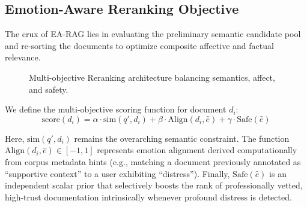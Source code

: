 \documentclass[conference]{IEEEtran}
\begin{document}
\subsection{Emotion-Aware Reranking Objective}
The crux of EA-RAG lies in evaluating the preliminary semantic candidate pool and re-sorting the documents to optimize composite affective and factual relevance.

\begin{figure}[htbp]
\centering
{}
\caption{Multi-objective Reranking architecture balancing semantics, affect, and safety.}
\label{fig:rerank}
\end{figure}

We define the multi-objective scoring function for document $d_i$:
\begin{equation}
\label{eq:score}
\text{score}(d_i) = \alpha \cdot \text{sim}(q', d_i) + \beta \cdot \text{Align}(d_i, \hat{e}) + \gamma \cdot \text{Safe}(\hat{e})
\end{equation}

Here, $\text{sim}(q', d_i)$ remains the overarching semantic constraint. The function $\text{Align}(d_i, \hat{e}) \in [-1, 1]$ represents emotion alignment derived computationally from corpus metadata hints (e.g., matching a document previously annotated as ``supportive context'' to a user exhibiting ``distress''). Finally, $\text{Safe}(\hat{e})$ is an independent scalar prior that selectively boosts the rank of professionally vetted, high-trust documentation intrinsically whenever profound distress is detected.
\end{document}
